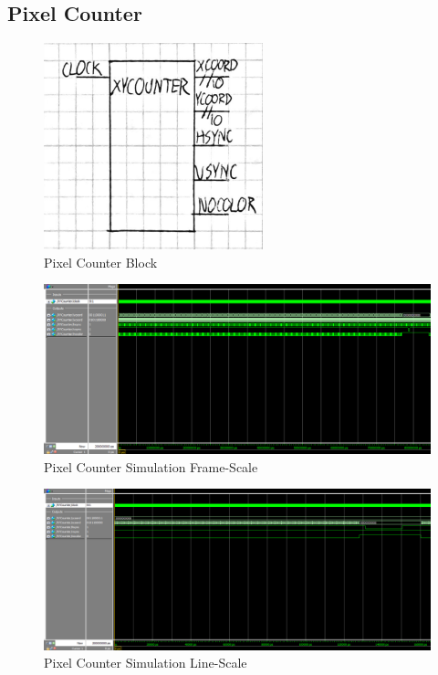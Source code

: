 \documentclass[]{article}
\begin{document}
\subsection{Pixel Counter}
\begin{figure}[H]\centering
    \includegraphics[width=0.5\linewidth]{figures/XYCounter_Block.png}
    \caption{Pixel Counter Block}
    \label{fig:pixelCounterBlock}
\end{figure}
\begin{figure}[H]\centering
    \includegraphics[width=\linewidth]{figures/XYCounter_Sim_Frame.png}
    \caption{Pixel Counter Simulation Frame-Scale}
    \label{fig:pixelCounterSimFrame}
\end{figure}
\begin{figure}[H]\centering
    \includegraphics[width=\linewidth]{figures/XYCounter_Sim_Line.png}
    \caption{Pixel Counter Simulation Line-Scale}
    \label{fig:pixelCounterSimLine}
\end{figure}
\end{document}
